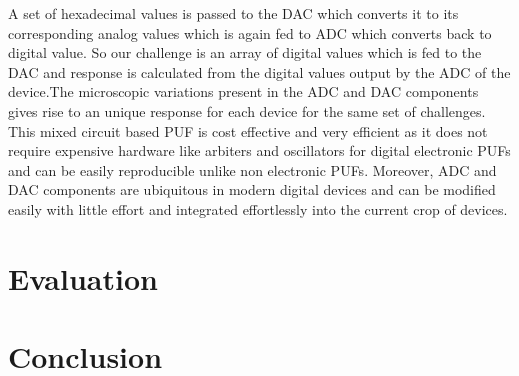 A set of hexadecimal values is passed to the DAC which converts it to its corresponding analog values which is again fed to ADC which converts back to digital value. So our challenge is an array of digital values which is fed to the DAC and response is calculated from the digital values output by the ADC of the device.The microscopic variations present in the ADC and DAC components gives rise to an unique response for each device for the same set of challenges. This mixed circuit based PUF is cost effective and very efficient as it does not require expensive hardware like arbiters and oscillators for digital electronic PUFs and can be easily reproducible unlike non electronic PUFs. Moreover, ADC and DAC components are ubiquitous in modern digital devices and can be modified easily with little effort and integrated effortlessly into the current crop of devices.

\section{Evaluation}

\section{Conclusion}
